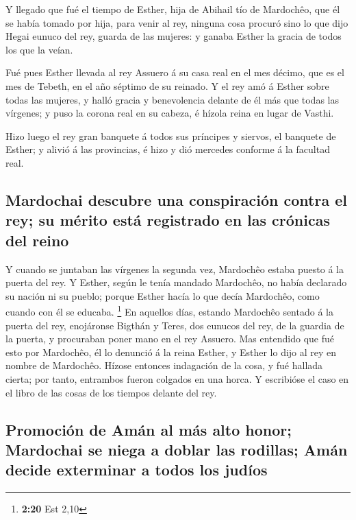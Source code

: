  Y llegado que fué el tiempo de Esther, hija de Abihail
tío de Mardochêo, que él se había tomado por hija, para venir al rey,
ninguna cosa procuró sino lo que dijo Hegai eunuco del rey, guarda de
las mujeres: y ganaba Esther la gracia de todos los que la veían.

 Fué pues Esther llevada al rey Assuero á su casa real en
el mes décimo, que es el mes de Tebeth, en el año séptimo de su reinado.
 Y el rey amó á Esther sobre todas las mujeres, y halló
gracia y benevolencia delante de él más que todas las vírgenes; y puso
la corona real en su cabeza, é hízola reina en lugar de Vasthi.

 Hizo luego el rey gran banquete á todos sus príncipes y
siervos, el banquete de Esther; y alivió á las provincias, é hizo y dió
mercedes conforme á la facultad real.

\hypertarget{mardochai-descubre-una-conspiraciuxf3n-contra-el-rey-su-muxe9rito-estuxe1-registrado-en-las-cruxf3nicas-del-reino}{%
\subsection{Mardochai descubre una conspiración contra el rey; su mérito
está registrado en las crónicas del
reino}\label{mardochai-descubre-una-conspiraciuxf3n-contra-el-rey-su-muxe9rito-estuxe1-registrado-en-las-cruxf3nicas-del-reino}}

 Y cuando se juntaban las vírgenes la segunda vez,
Mardochêo estaba puesto á la puerta del rey.  Y Esther,
según le tenía mandado Mardochêo, no había declarado su nación ni su
pueblo; porque Esther hacía lo que decía Mardochêo, como cuando con él
se educaba. \footnote{\textbf{2:20} Est 2,10}  En
aquellos días, estando Mardochêo sentado á la puerta del rey, enojáronse
Bigthán y Teres, dos eunucos del rey, de la guardia de la puerta, y
procuraban poner mano en el rey Assuero.  Mas entendido
que fué esto por Mardochêo, él lo denunció á la reina Esther, y Esther
lo dijo al rey en nombre de Mardochêo.  Hízose entonces
indagación de la cosa, y fué hallada cierta; por tanto, entrambos fueron
colgados en una horca. Y escribióse el caso en el libro de las cosas de
los tiempos delante del rey.

\hypertarget{promociuxf3n-de-amuxe1n-al-muxe1s-alto-honor-mardochai-se-niega-a-doblar-las-rodillas-amuxe1n-decide-exterminar-a-todos-los-juduxedos}{%
\subsection{Promoción de Amán al más alto honor; Mardochai se niega a
doblar las rodillas; Amán decide exterminar a todos los
judíos}\label{promociuxf3n-de-amuxe1n-al-muxe1s-alto-honor-mardochai-se-niega-a-doblar-las-rodillas-amuxe1n-decide-exterminar-a-todos-los-juduxedos}}

